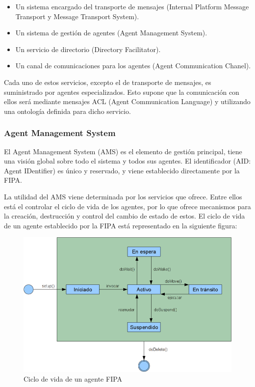 \begin{itemize}
 \item Un sistema encargado del transporte de mensajes (Internal Platform
 Message Transport y Message Transport System).
 \item Un sistema de gestión de agentes (Agent Management System).
 \item Un servicio de directorio (Directory Facilitator).
 \item Un canal de comunicaciones para los agentes (Agent Communication Chanel).
\end{itemize}

Cada uno de estos servicios, excepto el de transporte de mensajes, es
suministrado por agentes especializados. Esto supone que la comunicación con
ellos será mediante mensajes ACL (Agent Communication Language) y utilizando una
ontología definida para dicho servicio.

\subsubsection*{Agent Management System}

El Agent Management System (AMS) es el elemento de gestión principal, tiene una
visión global sobre todo el sistema y todos sus agentes. El identificador (AID:
Agent IDentifier) es único y reservado, y viene establecido directamente por la
FIPA.

La utilidad del AMS viene determinada por los servicios que ofrece. Entre ellos
está el controlar el ciclo de vida de los agentes, por lo que ofrece mecanismos
para la creación, destrucción y control del cambio de estado de estos. El ciclo
de vida de un agente establecido por la FIPA está representado en la siguiente
figura:

\begin{figure}[H]
 \centering
 \includegraphics[width=130mm]{figuras/cap4/fipa_agent.png}
 \caption{Ciclo de vida de un agente FIPA}
\end{figure}


